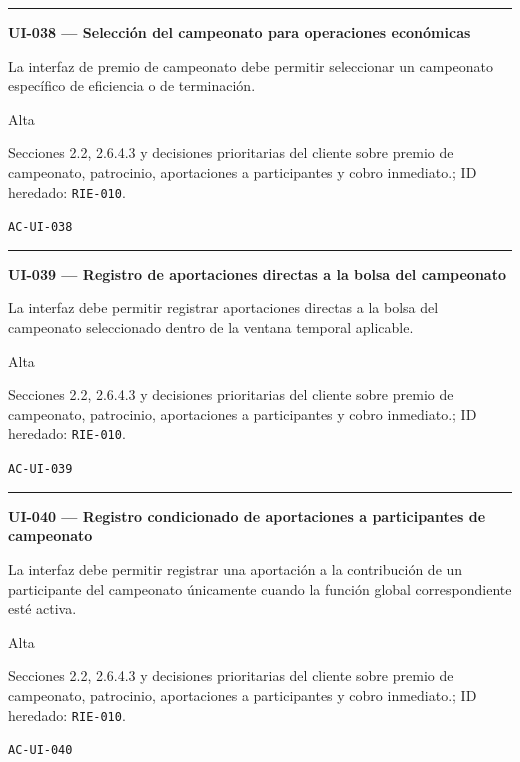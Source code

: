 \documentclass[10pt,letterpaper]{article}
\begin{document}
\vspace{0.25em}\hrule\vspace{0.65em}
\noindent\textbf{UI-038 --- Selección del campeonato para operaciones económicas}\par
\begin{description}[style=nextline,leftmargin=3.15cm,labelwidth=2.8cm,font=\normalfont\bfseries]
\item[Obligación] La interfaz de premio de campeonato debe permitir seleccionar un campeonato específico de eficiencia o de terminación.
\item[Prioridad] Alta
\item[Procedencia] Secciones 2.2, 2.6.4.3 y decisiones prioritarias del cliente sobre premio de campeonato, patrocinio, aportaciones a participantes y cobro inmediato.; ID heredado: \texttt{RIE-010}.
\item[Verificación] \texttt{AC-UI-038}
\end{description}
\vspace{0.25em}\hrule\vspace{0.65em}
\noindent\textbf{UI-039 --- Registro de aportaciones directas a la bolsa del campeonato}\par
\begin{description}[style=nextline,leftmargin=3.15cm,labelwidth=2.8cm,font=\normalfont\bfseries]
\item[Obligación] La interfaz debe permitir registrar aportaciones directas a la bolsa del campeonato seleccionado dentro de la ventana temporal aplicable.
\item[Prioridad] Alta
\item[Procedencia] Secciones 2.2, 2.6.4.3 y decisiones prioritarias del cliente sobre premio de campeonato, patrocinio, aportaciones a participantes y cobro inmediato.; ID heredado: \texttt{RIE-010}.
\item[Verificación] \texttt{AC-UI-039}
\end{description}
\vspace{0.25em}\hrule\vspace{0.65em}
\noindent\textbf{UI-040 --- Registro condicionado de aportaciones a participantes de campeonato}\par
\begin{description}[style=nextline,leftmargin=3.15cm,labelwidth=2.8cm,font=\normalfont\bfseries]
\item[Obligación] La interfaz debe permitir registrar una aportación a la contribución de un participante del campeonato únicamente cuando la función global correspondiente esté activa.
\item[Prioridad] Alta
\item[Procedencia] Secciones 2.2, 2.6.4.3 y decisiones prioritarias del cliente sobre premio de campeonato, patrocinio, aportaciones a participantes y cobro inmediato.; ID heredado: \texttt{RIE-010}.
\item[Verificación] \texttt{AC-UI-040}
\end{description}
\end{document}
